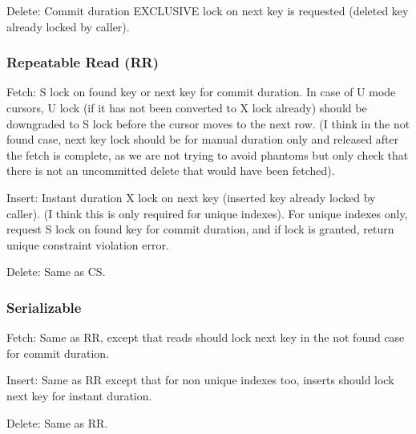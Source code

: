 \documentclass[a4paper,draft,oneside]{book}
\begin{document}
Delete: Commit duration EXCLUSIVE lock on next key is requested (deleted key already locked by caller). 

\subsubsection{Repeatable Read (RR)}

Fetch: S lock on found key or next key for commit duration. In case of U mode cursors, U lock (if it has not been converted to X lock already) should be downgraded to S lock before the cursor moves to the next row. (I think in the not found case, next key lock should be for manual duration only and released after the fetch is complete, as we are not trying to avoid phantoms but only check that there is not an uncommitted delete that would have been fetched). 

Insert: Instant duration X lock on next key (inserted key already locked by caller). (I think this is only required for unique indexes). For unique indexes only, request S lock on found key for commit duration, and if lock is granted, return unique constraint violation error. 

Delete: Same as CS. 

\subsubsection{Serializable}
Fetch: Same as RR, except that reads should lock next key in the not found case for commit duration. 

Insert: Same as RR except that for non unique indexes too, inserts should lock next key for instant duration. 

Delete: Same as RR. 
\end{document}
